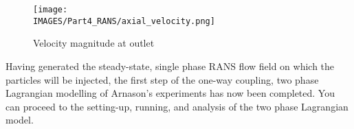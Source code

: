 %
\begin{figure}[H]
\centering
\texttt{[image: \\IMAGES/Part4\_RANS/axial\_velocity.png]}
\caption{Velocity magnitude at outlet}
\label{lag:axial_velocity}
\end{figure}
%
Having generated the steady-state, single phase RANS flow field on which the particles will be injected, the first step of the one-way coupling, two phase Lagrangian \CS modelling of Arnason's \cite{Arnason} experiments has now been completed.  You can proceed to the setting-up, running, and analysis of the two phase Lagrangian \CS model.
